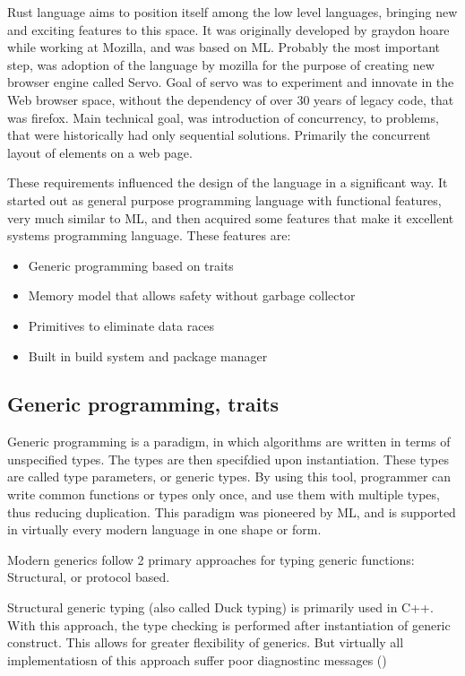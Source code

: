 Rust language aims to position itself among the low level languages, bringing new and exciting features to this space.
It was originally developed by graydon hoare   while working at Mozilla, and was based on
ML. Probably the most important step, was adoption of the language by mozilla for the purpose of creating new browser engine
called Servo. Goal of servo was to experiment and innovate in the Web browser space, without
the dependency of over 30 years of legacy code, that was firefox. Main technical goal, was introduction of concurrency,
to problems, that were historically had only sequential solutions. Primarily the concurrent layout of elements on a web page.


These requirements influenced the design of the language in a significant way. It started out as general purpose programming
language with functional features, very much similar to ML, and then acquired some features that make it excellent
systems programming language. These features are:
\begin{itemize}
    \item Generic programming based on traits
    \item Memory model that allows safety without garbage collector
    \item Primitives to eliminate data races
    \item Built in build system and package manager
\end{itemize}

\subsection{Generic programming, traits}
Generic programming is a paradigm, in which algorithms are written in terms of unspecified types.
The types are then specifdied upon instantiation. These types are called type parameters, or generic types.
By using this tool, programmer can write common functions or types only once, and use them with multiple
types, thus reducing duplication. This paradigm was pioneered by ML, and is supported in virtually every
modern language in one shape or form.

Modern generics follow 2 primary approaches for typing generic functions: Structural, or protocol based.

Structural generic typing (also called Duck typing) is primarily used in C++. With this approach, the type
checking is performed after instantiation of generic construct. This allows for greater flexibility of generics.
But virtually all implementatiosn of this approach suffer poor diagnostinc messages ()

